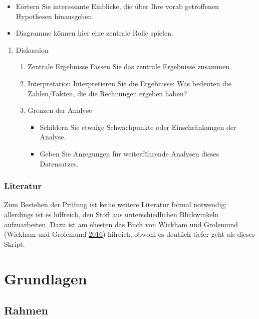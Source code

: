 \documentclass[12pt,ngerman,]{book}
\providecommand{\tightlist}{%
  \setlength{\itemsep}{0pt}\setlength{\parskip}{0pt}}
\begin{document}
\begin{itemize}
\tightlist
\item
  Eörtern Sie interessante Einblicke, die über Ihre vorab getroffenen
  Hypothesen hinausgehen.
\item
  Diagramme können hier eine zentrale Rolle spielen.
\end{itemize}

\begin{enumerate}
\def\labelenumi{\arabic{enumi}.}
\setcounter{enumi}{3}
\item
  Diskussion

  \begin{enumerate}
  \def\labelenumii{\arabic{enumii}.}
  \item
    Zentrale Ergebnisse Fassen Sie das zentrale Ergebnisse zusammen.
  \item
    Interpretation Interpretieren Sie die Ergebnisse: Was bedeuten die
    Zahlen/Fakten, die die Rechnungen ergeben haben?
  \item
    Grenzen der Analyse

    \begin{itemize}
    \tightlist
    \item
      Schildern Sie etwaige Schwachpunkte oder Einschränkungen der
      Analyse.
    \item
      Geben Sie Anregungen für weiterführende Analysen dieses
      Datensatzes.
    \end{itemize}
  \end{enumerate}
\end{enumerate}

\section{Literatur}\label{literatur}

Zum Bestehen der Prüfung ist keine weitere Literatur formal notwendig;
allerdings ist es hilfreich, den Stoff aus unterschiedlichen
Blickwinkeln aufzuarbeiten. Dazu ist am ehesten das Buch von Wickham und
Grolemund (Wickham und Grolemund \protect\hyperlink{ref-r4ds}{2016})
hilreich, obwohl es deutlich tiefer geht als dieses Skript.

\mainmatter

\setcounter{chapter}{0} \part{Grundlagen}

\chapter{Rahmen}\label{rahmen}
\end{document}
